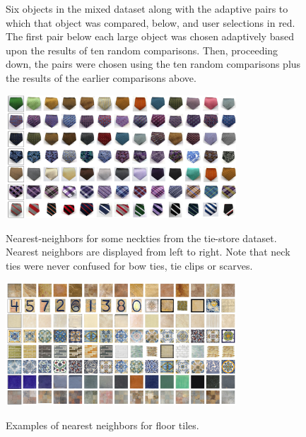 \documentclass{article}
\begin{document}
\begin{figure}
 \caption{\label{fig:adaptive-trips} Six objects in the mixed dataset along with the adaptive pairs to which that object was compared, below, and user selections in red.  The first pair below each large object was chosen adaptively based upon the results of ten random comparisons.  Then, proceeding down, the pairs were chosen using the ten random comparisons plus the results of the earlier comparisons above.}
\end{figure}
\begin{figure}
{\center \includegraphics[width=3.4in]{neckties_neighs.pdf}} 
\caption{\label{fig:nn} Nearest-neighbors for some neckties from the tie-store dataset.  Nearest neighbors are displayed from left to right.  Note that neck ties were never confused for bow ties, tie clips or scarves.
}
\end{figure}
\begin{figure}
{\center \includegraphics[width=3.4in]{tiles_neighs.pdf}} \caption{\label{fig:nn-tiles} Examples of nearest neighbors for floor tiles.}
\end{figure}
\end{document}
